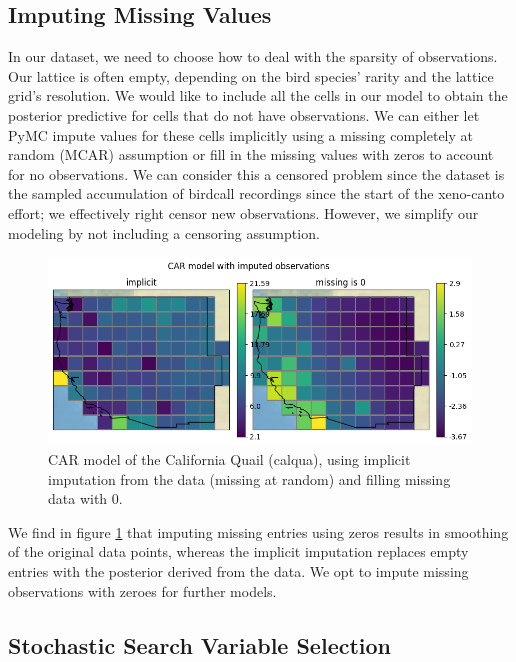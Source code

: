 \documentclass[notitlepage]{article}
\begin{document}
\subsection{Imputing Missing Values}

In our dataset, we need to choose how to deal with the sparsity of observations.
Our lattice is often empty, depending on the bird species' rarity and the lattice grid's resolution.
We would like to include all the cells in our model to obtain the posterior predictive for cells that do not have observations.
We can either let PyMC impute values for these cells implicitly using a missing completely at random (MCAR) assumption or fill in the missing values with zeros to account for no observations.
We can consider this a censored problem since the dataset is the sampled accumulation of birdcall recordings since the start of the xeno-canto effort; we effectively right censor new observations.
However, we simplify our modeling by not including a censoring assumption.

\begin{figure}[H]
\centering
\includegraphics[width=\textwidth]{report/figures/implicit_explicit_imputation.png}
\caption{CAR model of the California Quail (calqua), using implicit imputation from the data (missing at random) and filling missing data with 0.}
\label{fig:imputing}
\end{figure}

We find in figure \ref{fig:imputing} that imputing missing entries using zeros results in smoothing of the original data points, whereas the implicit imputation replaces empty entries with the posterior derived from the data.
We opt to impute missing observations with zeroes for further models.

\subsection{Stochastic Search Variable Selection}
\end{document}
